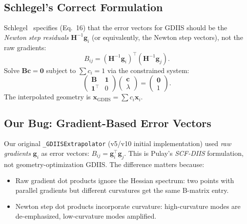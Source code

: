 \documentclass[11pt,a4paper]{article}
\newcommand{\vect}[1]{\bm{#1}}
\newcommand{\mat}[1]{\mathbf{#1}}
\theoremstyle{definition}
\begin{document}
\subsection{Schlegel's Correct Formulation}

Schlegel~\citep{schlegel2011} specifies (Eq.~16) that the error vectors
for GDIIS should be the \emph{Newton step residuals} $\mat{H}^{-1}\vect{g}_i$
(or equivalently, the Newton step vectors), not the raw gradients:
\begin{equation}
  B_{ij} = (\mat{H}^{-1}\vect{g}_i)^\top (\mat{H}^{-1}\vect{g}_j).
  \label{eq:gdiis-B}
\end{equation}
Solve $\mat{B}\vect{c} = \vect{0}$ subject to $\sum c_i = 1$ via the
constrained system:
\begin{equation}
  \begin{pmatrix} \mat{B} & \vect{1} \\ \vect{1}^\top & 0 \end{pmatrix}
  \begin{pmatrix} \vect{c} \\ \lambda \end{pmatrix}
  = \begin{pmatrix} \vect{0} \\ 1 \end{pmatrix}.
  \label{eq:gdiis-system}
\end{equation}
The interpolated geometry is $\vect{x}_\text{GDIIS} = \sum c_i \vect{x}_i$.

\subsection{Our Bug: Gradient-Based Error Vectors}

Our original \texttt{\_GDIISExtrapolator} (v5/v10 initial implementation)
used \emph{raw gradients} $\vect{g}_i$ as error vectors:
$B_{ij} = \vect{g}_i^\top\vect{g}_j$.  This is Pulay's \emph{SCF-DIIS}
formulation, not geometry-optimization GDIIS.  The difference matters because:
\begin{itemize}[nosep]
  \item Raw gradient dot products ignore the Hessian spectrum: two points
    with parallel gradients but different curvatures get the same B-matrix
    entry.
  \item Newton step dot products incorporate curvature: high-curvature modes
    are de-emphasized, low-curvature modes amplified.
\end{itemize}
\end{document}

